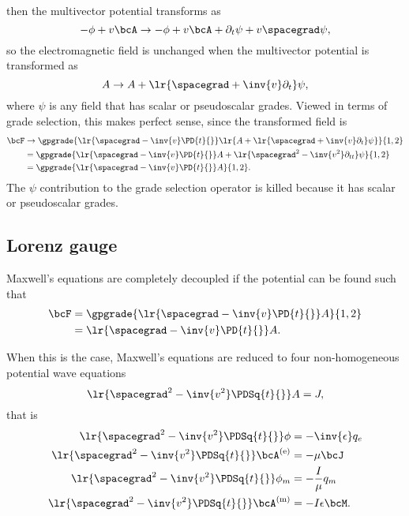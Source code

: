 then the multivector potential transforms as
\begin{equation}\label{eqn:potentialMethods:1520}
-\phi + v \bcA
\rightarrow -\phi + v \bcA + \partial_t \psi + v \spacegrad \psi,
\end{equation}
so the electromagnetic field is unchanged when the multivector potential is transformed as
\begin{equation}\label{eqn:potentialMethods:1540}
A \rightarrow A + \lr{ \spacegrad + \inv{v} \partial_t } \psi,
\end{equation}
where \( \psi \) is any field that has scalar or pseudoscalar grades.  Viewed in terms of grade selection, this makes perfect sense, since the transformed field is
\begin{equation}\label{eqn:potentialMethods:1560}
\begin{aligned}
\bcF
&\rightarrow \gpgrade{ \lr{ \spacegrad - \inv{v} \PD{t}{} } \lr{ A + \lr{ \spacegrad + \inv{v} \partial_t } \psi } }{1,2} \\
&= \gpgrade{ \lr{ \spacegrad - \inv{v} \PD{t}{} } A + \lr{ \spacegrad^2 - \inv{v^2} \partial_{tt} } \psi }{1,2} \\
&= \gpgrade{ \lr{ \spacegrad - \inv{v} \PD{t}{} } A }{1,2}.
\end{aligned}
\end{equation}
The \( \psi \) contribution to the grade selection operator is killed because it has scalar or pseudoscalar grades.
\subsection{Lorenz gauge}
Maxwell's equations are completely decoupled if the potential can be found such that
\begin{equation}\label{eqn:potentialMethods:1580}
\begin{aligned}
\bcF
&= \gpgrade{ \lr{ \spacegrad - \inv{v} \PD{t}{} } A }{1,2} \\
&= \lr{ \spacegrad - \inv{v} \PD{t}{} } A.
\end{aligned}
\end{equation}

When this is the case, Maxwell's equations are reduced to four non-homogeneous potential wave equations
\begin{equation}\label{eqn:potentialMethods:1620}
\lr{ \spacegrad^2 - \inv{v^2} \PDSq{t}{} } A = J,
\end{equation}
that is
\begin{equation}\label{eqn:potentialMethods:1600}
\begin{aligned}
\lr{ \spacegrad^2 - \inv{v^2} \PDSq{t}{} } \phi &= - \inv{\epsilon} q_e \\
\lr{ \spacegrad^2 - \inv{v^2} \PDSq{t}{} } \bcA^\e &= - \mu \bcJ \\
\lr{ \spacegrad^2 - \inv{v^2} \PDSq{t}{} } \phi_m &= - \frac{I}{\mu} q_m \\
\lr{ \spacegrad^2 - \inv{v^2} \PDSq{t}{} } \bcA^\m &= - I \epsilon \bcM.
\end{aligned}
\end{equation}

